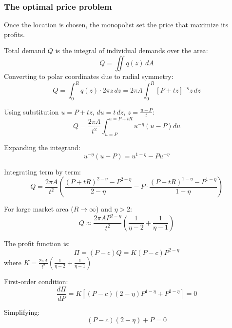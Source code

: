 \subsubsection*{The optimal price problem}
Once the location is chosen, the monopolist set the price that maximize its profits.


Total demand $Q$ is the integral of individual demands over the area:
\begin{equation}
    Q = \iint q(z) \, dA
\end{equation}
Converting to polar coordinates due to radial symmetry:
\begin{equation}
    Q = \int_0^{R} q(z) \cdot 2\pi z \, dz = 2\pi A \int_0^{R} [P + tz]^{-\eta} z \, dz
\end{equation}

Using substitution $u = P + tz$, $du = t \, dz$, $z = \frac{u - P}{t}$:
\begin{equation}
    Q = \frac{2\pi A}{t^2} \int_{u=P}^{u=P + tR} u^{-\eta} (u - P) du
\end{equation}

Expanding the integrand:
\begin{equation}
    u^{-\eta} (u - P) = u^{1-\eta} - Pu^{-\eta}
\end{equation}

Integrating term by term:
\begin{equation}
    Q = \frac{2\pi A}{t^2} \left( \frac{(P + tR)^{2-\eta} - P^{2-\eta}}{2-\eta} - P \cdot \frac{(P + tR)^{1-\eta} - P^{1-\eta}}{1-\eta} \right)
\end{equation}

For large market area ($R \to \infty$) and $\eta > 2$:
\begin{equation}
    Q \approx \frac{2\pi A P^{2-\eta}}{t^2} \left( \frac{1}{\eta-2} + \frac{1}{\eta-1} \right)
\end{equation}

The profit function is:
\begin{equation}
    \Pi = (P-c)Q = K(P-c)P^{2-\eta}
\end{equation}
where $K = \frac{2\pi A}{t^2} \left( \frac{1}{\eta-2} + \frac{1}{\eta-1} \right)$

First-order condition:
\begin{equation}
    \frac{d\Pi}{dP} = K[(P-c)(2-\eta)P^{1-\eta} + P^{2-\eta}] = 0
\end{equation}

Simplifying:
\begin{equation}
    (P-c)(2-\eta) + P = 0
\end{equation}

